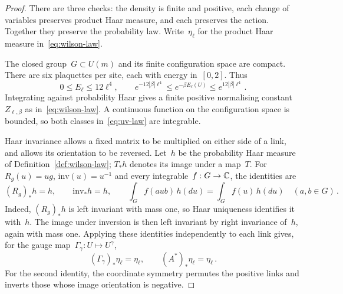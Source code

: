 \begin{proof}
There are three checks: the density is finite and positive, each change of variables preserves product Haar measure, and each preserves the action.
Together they preserve the probability law.
Write~$\eta_\ell$ for the product Haar measure in~\eqref{eq:wilson-law}.

The closed group~$G\subset U(m)$ and its finite configuration space are compact.
There are six plaquettes per site, each with energy in~$[0,2]$.
Thus
\begin{equation}\label{eq:uv-density-bounds}
 0\le E_\ell\le12\ell^4,\qquad
 e^{-12|\beta|\ell^4}\le e^{-\beta E_\ell(U)}\le e^{12|\beta|\ell^4}\,.
\end{equation}
Integrating against probability Haar gives a finite positive normalising constant~$Z_{\ell,\beta}$ as in~\eqref{eq:wilson-law}.
A continuous function on the configuration space is bounded, so both classes in~\eqref{eq:uv-law} are integrable.

Haar invariance allows a fixed matrix to be multiplied on either side of a link, and allows its orientation to be reversed.
Let~$h$ be the probability Haar measure of Definition~\ref{def:wilson-law}; $T_*h$ denotes its image under a map~$T$.
For~$R_g(u)=ug$, $\mathrm{inv}(u)=u^{-1}$ and every integrable~$f:G\to\mathbb C$, the identities are
\begin{equation}\label{eq:uv-haar-changes}
 (R_g)_*h=h,\qquad \mathrm{inv}_*h=h,\qquad
 \int_G f(aub)\,h(du)=\int_G f(u)\,h(du)\quad(a,b\in G)\,.
\end{equation}
Indeed, $(R_g)_*h$ is left invariant with mass one, so Haar uniqueness identifies it with~$h$.
The image under inversion is then left invariant by right invariance of~$h$, again with mass one.
Applying these identities independently to each link gives, for the gauge map~$\Gamma_\gamma:U\mapsto U^\gamma$,
\begin{equation}\label{eq:uv-product-changes}
 (\Gamma_\gamma)_*\eta_\ell=\eta_\ell,\qquad
 (A^*)_*\eta_\ell=\eta_\ell\,.
\end{equation}
For the second identity, the coordinate symmetry permutes the positive links and inverts those whose image orientation is negative.


\end{proof}
